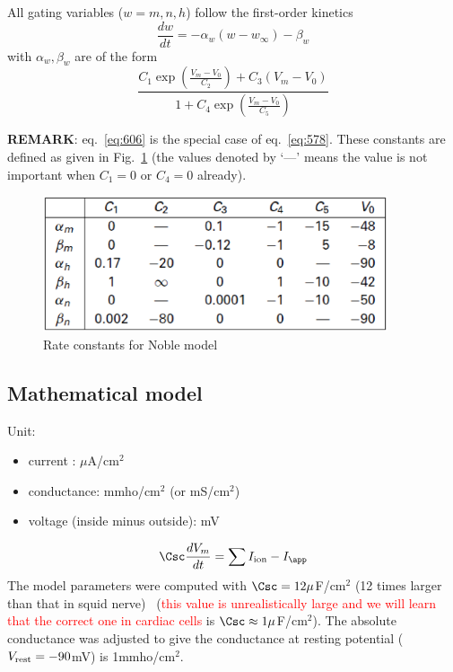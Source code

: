 \begin{framed}
  All gating variables ($w=m,n,h$) follow the first-order kinetics
\begin{equation}
  \label{eq:605}
  \frac{dw}{dt} = -\alpha_w(w-w_\infty) -\beta_w
\end{equation}
with $\alpha_w, \beta_w$ are of the form
\begin{equation}
  \label{eq:606}
  \frac{C_1\exp(\frac{V_m-V_0}{C_2})+C_3(V_m-V_0)}{1+C_4\exp(\frac{V_m-V_0}{C_5})}
\end{equation}
\end{framed}

{\bf REMARK}: eq.~\eqref{eq:606} is the special case of
eq.~\eqref{eq:578}. These constants are defined as given in
Fig.~\ref{fig:Noble_rate_constant} (the values denoted by `---' means
the value is not important when $C_1=0$ or $C_4=0$ already).
\begin{figure}[hbt]
  \centerline{\includegraphics[height=4cm,
    angle=0]{./images/Noble_rate_constant.eps}}
\caption{Rate constants for Noble model}
\label{fig:Noble_rate_constant}
\end{figure}


\subsection{Mathematical model}
\label{sec:mathematical-model-2}

Unit:
\begin{itemize}
\item current : $\mu$A/cm$^2$
\item conductance: mmho/cm$^2$ (or mS/cm$^2$)
\item voltage (inside minus outside): mV
\end{itemize}

\begin{equation}
\Csc\frac{dV_m}{dt} = \sum I_\ion - I_\app
\end{equation}
The model parameters were computed with $\Csc=12\mu$F/cm$^2$ (12 times
larger than that in squid nerve)~\citep{weidmann1952ecp}
(\textcolor{red}{this value is unrealistically large and we will learn
  that the correct one in cardiac cells} is $\Csc\approx 1\mu$F/cm$^2$).
The absolute conductance was adjusted to give the conductance at resting
potential ($V_{\text{rest}}=-90$mV) is 1mmho/cm$^2$.

